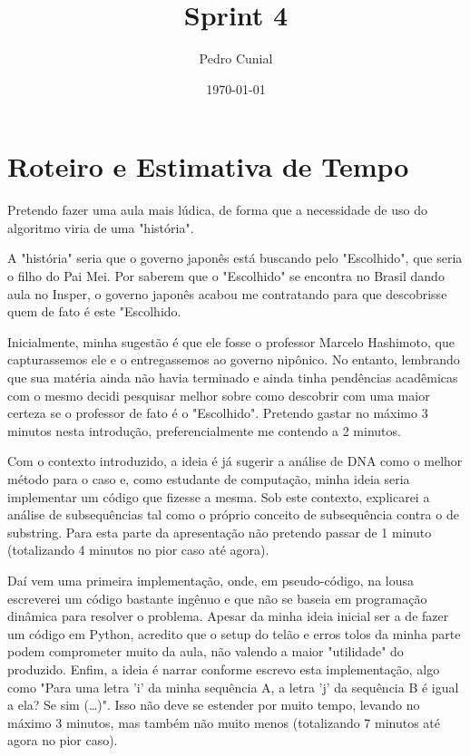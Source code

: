 \documentclass[11pt]{article}
\author{Pedro Cunial}
\date{\today}
\title{Sprint 4}
\begin{document}
\maketitle
\tableofcontents


\section{Roteiro e Estimativa de Tempo}
\label{sec:orgdd9cb11}
Pretendo fazer uma aula mais lúdica, de forma que a necessidade de uso do algoritmo
viria de uma "história".

A "história" seria que o governo japonês está buscando pelo "Escolhido", que seria o
filho do Pai Mei. Por saberem que o "Escolhido" se encontra no Brasil dando aula no
Insper, o governo japonês acabou me contratando para que descobrisse quem de fato é
este "Escolhido.

Inicialmente, minha sugestão é que ele fosse o professor Marcelo Hashimoto, que
capturassemos ele e o entregassemos ao governo nipônico. No entanto, lembrando que
sua matéria ainda não havia terminado e ainda tinha pendências acadêmicas com o mesmo
decidi pesquisar melhor sobre como descobrir com uma maior certeza se o professor de
fato é o "Escolhido". Pretendo gastar no máximo 3 minutos nesta introdução,
preferencialmente me contendo a 2 minutos.

Com o contexto introduzido, a ideia é já sugerir a análise de DNA como o melhor
método para o caso e, como estudante de computação, minha ideia seria implementar
um código que fizesse a mesma. Sob este contexto, explicarei a análise de subsequências
tal como o próprio conceito de subsequência contra o de substring. Para esta parte da
apresentação não pretendo passar de 1 minuto (totalizando 4 minutos no pior caso até
agora).

Daí vem uma primeira implementação, onde, em pseudo-código, na lousa escreverei um
código bastante ingênuo e que não se baseia em programação dinâmica para resolver o
problema. Apesar da minha ideia inicial ser a de fazer um código em Python, acredito
que o setup do telão e erros tolos da minha parte podem comprometer muito da aula,
não valendo a maior "utilidade" do produzido. Enfim, a ideia é narrar conforme escrevo
esta implementação, algo como "Para uma letra 'i' da minha sequência A, a letra 'j' da
sequência B é igual a ela? Se sim (\ldots{})". Isso não deve se estender por muito tempo,
levando no máximo 3 minutos, mas também não muito menos (totalizando 7 minutos até agora
no pior caso).
\end{document}
